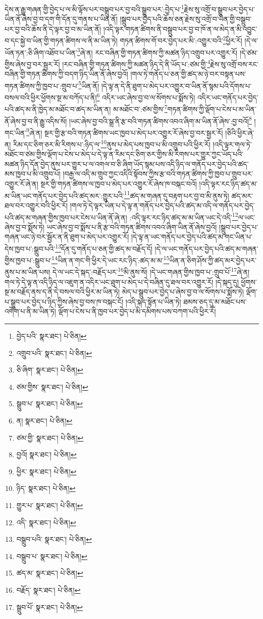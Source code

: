 དེས་ན་རྒྱུ་གཞན་གྱི་བྱེད་པ་ལ་མི་ལྟོས་པར་བསྒྲུབ་པར་བྱ་བའི་སྒྲུབ་པར་:བྱེད་པ་\footnote{བྱེད་པའི་  སྣར་ཐང་།  པེ་ཅིན། }རྗེས་སུ་འགྲོ་བ་སྒྲུབ་པར་བྱེད་པ་ཡིན་ནོ་ཞེས་བྱ་བ་དག་གི་དོན་དུ་གནས་པ་ཡིན་ནོ། །སྒྲུབ་པར་བྱེད་པའི་ཆོས་ཅན་རྗེས་སུ་འགྲོ་བ་ཡིན་གྱི་བསྒྲུབ་པར་བྱ་བའི་ཆོས་ནི་དེ་ལྟར་བྱ་བ་མ་ཡིན་ནོ། །འདི་ལྟར་གཏན་ཚིགས་ནི་བསྒྲུབ་པར་བྱ་བ་ཁོ་ན་ལ་མེད་ན་མི་འབྱུང་བ་དང་སྐྱེ་བ་ཡིན་གྱི་གཏན་ཚིགས་ལ་ནི་མ་ཡིན་ཏེ། གཏན་ཚིགས་གོ་བར་བྱེད་པར་མི་:འགྱུར་བའི་\footnote{འགྲུབ་པའི་  སྣར་ཐང་།  པེ་ཅིན། }ཕྱིར་རོ། །དེ་ལ་ཡོན་ཏན་:ཅི་ཞིག་འཐོབ་པ་ཡིན་\footnote{ཅི་ཞིག་  སྣར་ཐང་།  པེ་ཅིན། }ཞེ་ན། རང་བཞིན་གྱི་གཏན་ཚིགས་ཀྱི་མཚན་ཉིད་འགྲུབ་པར་འགྱུར་རོ། །དེ་ཙམ་གྱིས་ཞེས་བྱ་བར་སྦྱར་རོ། །རང་བཞིན་གྱི་གཏན་ཚིགས་ཀྱི་མཚན་ཉིད་དེ་ནི་ཡོད་པ་:ཙམ་གྱི་\footnote{ཙམ་གྱིས་  སྣར་ཐང་།  པེ་ཅིན། }རྗེས་སུ་འགྲོ་བས་རང་བཞིན་གྱི་གཏན་ཚིགས་ཀྱི་བདག་ཉིད་ཡིན་ནོ་ཞེས་བྱའོ། །གལ་ཏེ་གནོད་པ་ཅན་གྱི་ཚད་མ་ཉེ་བར་བསྟན་པས་གཏན་ཚིགས་ཀྱི་ཁྱབ་པ་:གྲུབ་པ་\footnote{སྒྲུབ་པ་  སྣར་ཐང་།  པེ་ཅིན། }ཡིན་ནོ། །དེ་ལྟ་ན་དེ་ནི་ཐུག་པ་མེད་པར་འགྱུར་བ་ཡིན་ནོ་སྙམ་པའི་དོགས་པ་བསལ་བའི་ཕྱིར་ཕྱོགས་སྔ་མ་བཀོད་པ་ནི།\footnote{ན།  སྣར་ཐང་།  པེ་ཅིན། } འདིར་ཡང་ཞེས་བྱ་བ་ལ་སོགས་པ་སྨོས་ཏེ། འདིར་ཡང་གནོད་པར་བྱེད་པའི་ཚད་མ་ནི་ཁྱེད་མ་མཐོང་བ་ཚད་མ་ཡིན་ན། མ་མཐོང་བ་:ཙམ་གྱིས་\footnote{ཙམ་གྱི་  སྣར་ཐང་།  པེ་ཅིན། }གཏན་ཚིགས་ཀྱི་ལྡོག་པ་ངེས་པ་མ་ཡིན་ནོ་ཞེས་བྱ་བ་ནི་རྒྱུ་འདིས་སོ། །ཡང་ཞེས་བྱ་བའི་སྒྲ་ནི་རྩ་བའི་གཏན་ཚིགས་འབའ་ཞིག་མ་ཡིན་ནོ་ཞེས་:བྱ་བའོ།\footnote{བྱའོ།  སྣར་ཐང་།  པེ་ཅིན། } །གང་ཡིན་\footnote{ཕྱིར་  སྣར་ཐང་།  པེ་ཅིན། }ཞེ་ན། སྔར་གྱི་རྩ་བའི་གཏན་ཚིགས་ཡང་ཁྱབ་པ་མེད་པར་འགྱུར་རོ་ཞེས་བྱ་བར་སྦྱར་རོ། །ཅིའི་ཕྱིར་ཞེ་ན། རིམ་དང་ཅིག་ཅར་མི་རིགས་པ་:ཉིད་ལ་\footnote{ཉིད་  སྣར་ཐང་།  པེ་ཅིན། }ནུས་པ་མེད་པས་ཁྱབ་པ་མི་འགྲུབ་པའི་ཕྱིར་རོ། །འདི་ལྟར་གལ་ཏེ་མཐོང་བ་ཙམ་གྱིས་ལྡོག་པ་ངེས་པ་མེད་པ་དེ་ལྟ་ན་རིམ་དང་ཅིག་ཅར་གྱིས་མི་རིགས་པར་གྱུར་ཀྱང་ཡོད་པའི་མཚན་ཉིད་དོན་བྱེད་ནུས་པར་གྱུར་པ་ལ་འགལ་བ་ཅི་ཞིག་ཡོད་སྙམ་པས་འདི་ཉིད་ལ་གནོད་པར་བྱེད་པའི་ཚད་མས་ཁྱབ་པ་མི་འགྲུབ་པོ། །བརྒྱ་ལ་འདི་མ་གྲུབ་ཀྱང་འདིའི་སྟོབས་ཀྱིས་རྩ་བའི་གཏན་ཚིགས་ཀྱི་ཁྱབ་པ་གྲུབ་པར་འགྱུར་རོ་ཞེ་ན། སྔར་གྱི་གཏན་ཚིགས་ལ་ཁྱབ་པ་མེད་པར་འགྱུར་རོ་ཞེས་ཁ་བསྐང་བའོ། །འདི་ལྟར་རང་ཉིད་ཚད་མ་མ་ཡིན་ཡང་གནོད་པར་བྱེད་པའི་ཚད་མར་:གྱུར་པའི་\footnote{གྱུར་པ་  སྣར་ཐང་།  པེ་ཅིན། }ཚད་མ་གཞན་དུ་བརྟག་པར་བྱ་བ་མི་ནུས་ཏེ། ཚད་མར་ཐལ་བར་འགྱུར་བའི་ཕྱིར་རོ། །གལ་ཏེ་དེ་ལྟར་ཡིན་པ་དེ་ལྟ་ན་གནོད་པར་བྱེད་པའི་ཚད་མ་འདི་ལ་གནོད་པར་བྱེད་པའི་ཚད་མ་གཞན་གྱིས་ཁྱབ་པར་ངེས་པ་ཡིན་ནོ་ཞེ་ན། :འདི་ལྟར་རང་ཉིད་ཚད་མ་མ་ཡིན་ཡང་དེ་འདི་\footnote{འདི་  སྣར་ཐང་།  པེ་ཅིན། }ལ་ཡང་ཞེས་བྱ་བ་སྨོས་ཏེ། ཡང་ཞེས་བྱ་བ་སྨོས་པ་ནི་རྩ་བའི་གཏན་ཚིགས་འབའ་ཞིག་ཡིན་ནོ་ཞེས་བྱའོ། །སྒྲུབ་པར་བྱེད་པ་གཞན་ཡང་ཉེ་བར་སྦྱོར་ན་ནི་ཐུག་པ་མེད་པར་འགྱུར་རོ། །དེ་ལྟ་ན་ཡང་གནོད་པར་བྱེད་པའི་ཚད་མ་གང་ཡིན་པ་དེས་ཁྱབ་པ་:སྒྲུབ་པའི་\footnote{བསྒྲུབ་པའི་  སྣར་ཐང་།  པེ་ཅིན། }དོན་དུ་གནོད་པ་ཅན་གྱི་ཚད་མ་བརྗོད་དོ། །དེ་ལ་ཡང་གནོད་པར་བྱེད་པའི་ཚད་མ་གཞན་གྱིས་ཁྱབ་པ་:སྒྲུབ་པ་\footnote{བསྒྲུབ་པ་  སྣར་ཐང་།  པེ་ཅིན། }ཡིན་ན་གང་གི་ཕྱིར་དེ་ཡང་རང་ཉིད་:ཚད་མ་མ་\footnote{ཚད་མ་  སྣར་ཐང་།  པེ་ཅིན། }ཡིན་ན་ཅིག་ཤོས་ཀྱི་ཚད་མར་བྱེད་པར་ནུས་པ་མ་ཡིན་པས། དེ་ལ་ཡང་དེ་སྐད་:བརྗོད་པར་\footnote{བརྗོད་  སྣར་ཐང་།  པེ་ཅིན། }མི་ནུས་སོ། །དེ་ཡང་གཞན་གྱིས་ཁྱབ་པ་:གྲུབ་པོ་\footnote{སྒྲུབ་པོ་  སྣར་ཐང་།  པེ་ཅིན། }ཞེ་ན། གལ་ཏེ་དེ་ལྟ་ན་འདི་ཉིད་ལ་འཇུག་ན་འདིར་ཡང་ཐུག་པ་མེད་པ་དེ་བཞིན་དུ་ཐལ་བར་འགྱུར་རོ། །དེ་སྐད་དུ། ཕྱོགས་སྔ་མ་བརྗོད་ནས་ད་ནི་དེ་བསལ་བའི་ཕྱིར་མ་ཡིན་ཏེ། མེད་པ་སྒྲུབ་པར་བྱེད་པ་ཞེས་བྱ་བ་ལ་སོགས་པ་སྨོས་ཏེ། ལྡོག་པ་སྒྲུབ་པར་བྱེད་པ་ཉིད་ཀྱིས་ཞེས་བྱ་བས་ཁ་བསྐང་ངོ། །འདི་སྐད་སྟོན་པ་ཡིན་ཏེ། ཐམས་ཅད་དུ་མ་མཐོང་པས་འགོག་པ་ནི་མ་ཡིན་ཏེ། ལྡོག་པ་ངེས་པ་ནི་ཁྱབ་པར་བྱེད་པ་མི་དམིགས་པས་བཀག་པའི་ཕྱིར་རོ། 